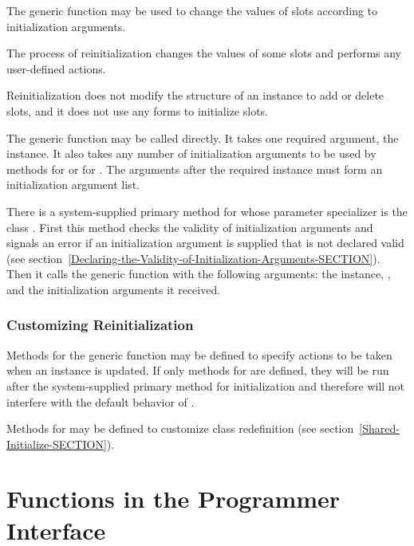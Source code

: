 The generic function  may be used to change
the values of slots according to initialization arguments.

The process of reinitialization changes the values of some slots and
performs any user-defined actions.

Reinitialization does not modify the structure
of an instance to add or delete slots, and it does not use any 
 forms to initialize slots.

The generic function  may be called
directly.  It takes one required argument, the instance.  It also
takes any number of initialization arguments to be used by methods for
 or for . The
arguments after the required instance must form an initialization
argument list.

There is a system-supplied primary method for 
 whose parameter specializer is the class 
.  First this method checks the validity of
initialization arguments and signals an error if an initialization
argument is supplied that is not declared valid (see
section~\ref{Declaring-the-Validity-of-Initialization-Arguments-SECTION}).
Then it calls the generic function 
 with the following arguments: the instance, 
, and the initialization arguments it received.

\subsubsection{Customizing Reinitialization}

Methods for the generic function  may be defined to specify
actions to be taken when an instance is updated.  If only 
methods for  are defined, they will be run
after the system-supplied primary method for initialization and
therefore will not interfere with the default behavior of 
.

Methods for  may be defined to customize class
redefinition (see section~\ref{Shared-Initialize-SECTION}).

\section{Functions in the Programmer Interface}
\label{Functions-in-the-Programmer-Interface-SECTION}

